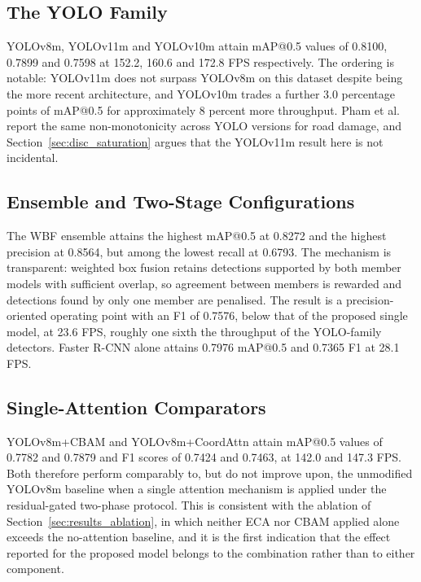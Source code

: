 \documentclass[MScCS]{uccthesis}
\begin{document}
\subsection{The YOLO Family}

YOLOv8m, YOLOv11m and YOLOv10m attain mAP@0.5 values of 0.8100, 0.7899 and
0.7598 at 152.2, 160.6 and 172.8 FPS respectively. The ordering is notable:
YOLOv11m does not surpass YOLOv8m on this dataset despite being the more recent
architecture, and YOLOv10m trades a further 3.0 percentage points of mAP@0.5
for approximately 8 percent more throughput. Pham et
al.~\parencite{pham2024optimizing} report the same non-monotonicity across YOLO
versions for road damage, and Section~\ref{sec:disc_saturation} argues that the
YOLOv11m result here is not incidental.

\subsection{Ensemble and Two-Stage Configurations}

The WBF ensemble attains the highest mAP@0.5 at 0.8272 and the highest
precision at 0.8564, but among the lowest recall at 0.6793. The mechanism is
transparent: weighted box fusion retains detections supported by both member
models with sufficient overlap, so agreement between members is rewarded and
detections found by only one member are penalised. The result is a
precision-oriented operating point with an F1 of 0.7576, below that of the
proposed single model, at 23.6 FPS, roughly one sixth the throughput of the
YOLO-family detectors. Faster R-CNN alone attains 0.7976 mAP@0.5 and 0.7365 F1
at 28.1 FPS.

\subsection{Single-Attention Comparators}

YOLOv8m+CBAM and YOLOv8m+CoordAttn attain mAP@0.5 values of 0.7782 and 0.7879
and F1 scores of 0.7424 and 0.7463, at 142.0 and 147.3 FPS. Both therefore
perform comparably to, but do not improve upon, the unmodified YOLOv8m baseline
when a single attention mechanism is applied under the residual-gated two-phase
protocol. This is consistent with the ablation of
Section~\ref{sec:results_ablation}, in which neither ECA nor CBAM applied alone
exceeds the no-attention baseline, and it is the first indication that the
effect reported for the proposed model belongs to the combination rather than
to either component.
\end{document}
